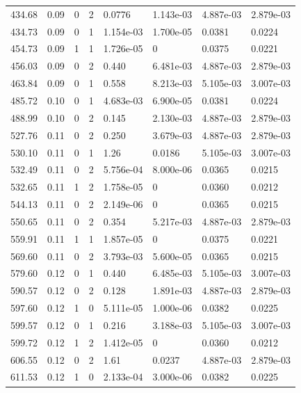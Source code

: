 \documentclass[preview]{standalone}
\begin{document}
{{{\begin{tabular}{L{1.2cm}C{1.2cm} C{0.3cm}C{0.5cm} C{1.4cm}C{1.4cm} C{1.4cm}C{1.4cm}}
  434.68  &  0.09  & 0     &  2 &  0.0776  & 1.143e-03  & 4.887e-03 &  2.879e-03   \\ 
  434.73  &  0.09  & 0     &  1 &  1.154e-03  & 1.700e-05  & 0.0381 &  0.0224   \\ 
  454.73  &  0.09  & 1     &  1 &  1.726e-05  & 0  & 0.0375 &  0.0221   \\ 
  456.03  &  0.09  & 0     &  2 &  0.440  & 6.481e-03  & 4.887e-03 &  2.879e-03   \\ 
  463.84  &  0.09  & 0     &  1 &  0.558  & 8.213e-03  & 5.105e-03 &  3.007e-03   \\ 
  485.72  &  0.10  & 0     &  1 &  4.683e-03  & 6.900e-05  & 0.0381 &  0.0224   \\ 
  488.99  &  0.10  & 0     &  2 &  0.145  & 2.130e-03  & 4.887e-03 &  2.879e-03   \\ 
  527.76  &  0.11  & 0     &  2 &  0.250  & 3.679e-03  & 4.887e-03 &  2.879e-03   \\ 
  530.10  &  0.11  & 0     &  1 &  1.26  & 0.0186  & 5.105e-03 &  3.007e-03   \\ 
  532.49  &  0.11  & 0     &  2 &  5.756e-04  & 8.000e-06  & 0.0365 &  0.0215   \\ 
  532.65  &  0.11  & 1     &  2 &  1.758e-05  & 0  & 0.0360 &  0.0212   \\ 
  544.13  &  0.11  & 0     &  2 &  2.149e-06  & 0  & 0.0365 &  0.0215   \\ 
  550.65  &  0.11  & 0     &  2 &  0.354  & 5.217e-03  & 4.887e-03 &  2.879e-03   \\ 
  559.91  &  0.11  & 1     &  1 &  1.857e-05  & 0  & 0.0375 &  0.0221   \\ 
  569.60  &  0.11  & 0     &  2 &  3.793e-03  & 5.600e-05  & 0.0365 &  0.0215   \\ 
  579.60  &  0.12  & 0     &  1 &  0.440  & 6.485e-03  & 5.105e-03 &  3.007e-03   \\ 
  590.57  &  0.12  & 0     &  2 &  0.128  & 1.891e-03  & 4.887e-03 &  2.879e-03   \\ 
  597.60  &  0.12  & 1     &  0 &  5.111e-05  & 1.000e-06  & 0.0382 &  0.0225   \\ 
  599.57  &  0.12  & 0     &  1 &  0.216  & 3.188e-03  & 5.105e-03 &  3.007e-03   \\ 
  599.72  &  0.12  & 1     &  2 &  1.412e-05  & 0  & 0.0360 &  0.0212   \\ 
  606.55  &  0.12  & 0     &  2 &  1.61  & 0.0237  & 4.887e-03 &  2.879e-03   \\ 
  611.53  &  0.12  & 1     &  0 &  2.133e-04  & 3.000e-06  & 0.0382 &  0.0225   \\ 

\end{tabular}}}}
\end{document}
